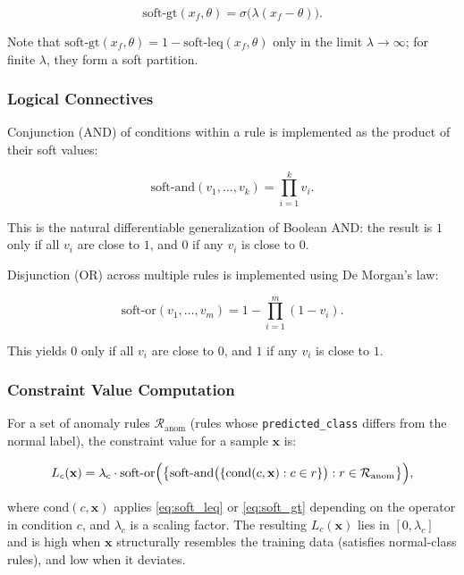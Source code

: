 \begin{equation}
\text{soft-gt}(x_f, \theta) = \sigma\bigl(\lambda (x_f - \theta)\bigr).
\label{eq:soft_gt}
\end{equation}

Note that $\text{soft-gt}(x_f, \theta) = 1 - \text{soft-leq}(x_f, \theta)$ only in the limit $\lambda \to \infty$; for finite $\lambda$, they form a soft partition.

\subsubsection{Logical Connectives}

Conjunction (AND) of conditions within a rule is implemented as the product of their soft values:

\begin{equation}
\text{soft-and}(v_1, \dots, v_k) = \prod_{i=1}^{k} v_i.
\label{eq:soft_and}
\end{equation}

This is the natural differentiable generalization of Boolean AND: the result is $1$ only if all $v_i$ are close to $1$, and $0$ if any $v_i$ is close to $0$.

Disjunction (OR) across multiple rules is implemented using De Morgan's law:

\begin{equation}
\text{soft-or}(v_1, \dots, v_m) = 1 - \prod_{i=1}^{m} (1 - v_i).
\label{eq:soft_or}
\end{equation}

This yields $0$ only if all $v_i$ are close to $0$, and $1$ if any $v_i$ is close to $1$.

\subsubsection{Constraint Value Computation}

For a set of anomaly rules $\mathcal{R}_{\text{anom}}$ (rules whose \texttt{predicted\_class} differs from the normal label), the constraint value for a sample $\mathbf{x}$ is:

\begin{equation}
L_c(\mathbf{x}) = \lambda_c \cdot \text{soft-or}\Bigl( \bigl\{ \text{soft-and}\bigl( \{ \text{cond}(c, \mathbf{x}) : c \in r \} \bigr) : r \in \mathcal{R}_{\text{anom}} \bigr\} \Bigr),
\label{eq:soft_constraint}
\end{equation}

where $\text{cond}(c, \mathbf{x})$ applies \eqref{eq:soft_leq} or \eqref{eq:soft_gt} depending on the operator in condition $c$, and $\lambda_c$ is a scaling factor. The resulting $L_c(\mathbf{x})$ lies in $[0, \lambda_c]$ and is high when $\mathbf{x}$ structurally resembles the training data (satisfies normal-class rules), and low when it deviates.


